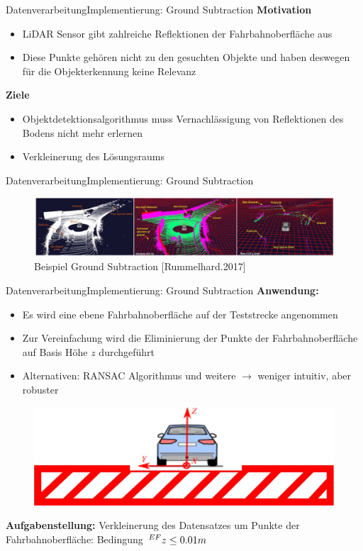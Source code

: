 \documentclass[169, handout	]{THIbeamer} %
\begin{document}
	\begin{frame}{Datenverarbeitung}{Implementierung: Ground Subtraction}
		\textbf{Motivation}
		\begin{itemize}
			\item LiDAR Sensor gibt zahlreiche Reflektionen der Fahrbahnoberfläche aus
			\item Diese Punkte gehören nicht zu den gesuchten Objekte und haben deswegen für die Objekterkennung keine Relevanz \\
		\end{itemize}
		\textbf{Ziele}
		\begin{itemize}
			\item Objektdetektionsalgorithmus muss Vernachlässigung von Reflektionen des Bodens nicht mehr erlernen
			\item Verkleinerung des Lösungsraums  
		\end{itemize}	
	\end{frame}
	\begin{frame}{Datenverarbeitung}{Implementierung: Ground Subtraction}
		\vspace{1.5cm}
		\begin{figure}
			\includegraphics[scale=0.3]{required/Ground Subtraction.jpg}
			\caption{Beispiel Ground Subtraction [Rummelhard.2017]}
        	\label{Ground Subtraction}
       	\end{figure}
	\end{frame}
	\begin{frame}{Datenverarbeitung}{Implementierung: Ground Subtraction}
		\textbf{Anwendung:}
		\begin{itemize}
			\item Es wird eine ebene Fahrbahnoberfläche auf der Teststrecke angenommen
			\item Zur Vereinfachung wird die Eliminierung der Punkte der Fahrbahnoberfläche auf Basis Höhe $z$ durchgeführt
			\item Alternativen: RANSAC Algorithmus und weitere $\rightarrow$ weniger intuitiv, aber robuster			
		\end{itemize}
		\begin{figure}
			\includegraphics[scale=0.5]{required/Ground Subtraction Implementierung.jpg} 
		\end{figure}
		\textbf{Aufgabenstellung:} Verkleinerung des Datensatzes um Punkte der Fahrbahnoberfläche: Bedingung $\hspace*{0.2em}^{EF}\vspace*{-0.2em}z \leq 0.01m$
	\end{frame}
\end{document}
